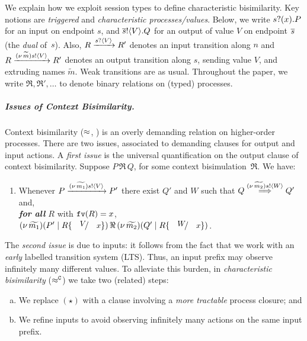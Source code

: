 \documentclass[a4paper,UKenglish]{lipics}
\theoremstyle{definition}
\begin{document}
We explain how we exploit session types to 
define characteristic bisimilarity.
Key notions are \emph{triggered} and \emph{characteristic processes/values}.
Below, we 
write $s ? (x) .{P}$ 
for an input on %
endpoint $s$, 
and $\overline{s} ! \langle V \rangle . Q$
for an output of value $V$ 
on endpoint $\overline{s}$ (the \emph{dual} of~$s$).
Also, $R \xrightarrow{s ? \langle V \rangle} R'$ denotes an input transition along $n$
and
$R \xrightarrow{(\nu\, \widetilde{m}) s ! \langle V \rangle} R'$
denotes an output transition along $s$, 
sending value $V$, and extruding names $\widetilde{m}$. 
Weak transitions are as usual.
Throughout the paper, we write $\Re, \Re',\ldots$ to denote binary relations on (typed) processes.


\subparagraph{Issues of Context Bisimilarity.}
Context bisimilarity ($\approx$, ) is an overly demanding relation on higher-order processes. 
There are two issues, associated to demanding clauses for output and input actions. 
A \emph{first issue} %
is 
the universal quantification on the output clause of context bisimilarity.
Suppose $P \,\Re\, Q$, for some context bisimulation~$\Re$. We have:
\begin{enumerate}[$(\star)$]
	\item	Whenever 
		$P \xrightarrow{(\nu\, \widetilde{m_1}) s ! \langle V \rangle} P'$
		there exist
		$Q'$ and $W$
		such that 
		$Q \stackrel{(\nu\, \widetilde{m_2}) s ! \langle W \rangle}{\Longrightarrow} Q'$
		and, \\ \emph{\textbf{for all} $R$}  with $\mathtt{fv}(R)=x$, 
		$\newsp{\widetilde{m_1}}{P' \Par R\subst{V}{x}} \,\Re\, \newsp{\widetilde{m_2}}{Q' \Par R\subst{W}{x}}$.
\end{enumerate}

\noi The \emph{second issue} is due to inputs: it  
follows from 
the fact that we work with an \emph{early}
labelled transition system (LTS). Thus, %
an input prefix may observe
infinitely many different values.
To alleviate this burden,
in %
\emph{characteristic
bisimilarity} ($\approx^\mathtt{C}$)
we take two (related) steps: 
\begin{enumerate}[(a)]
	\item We replace $(\star)$ with a clause involving a \emph{more tractable} process closure; and 
	\item We refine  inputs %
	to avoid observing infinitely many actions on the same input prefix.
\end{enumerate}
\end{document}
